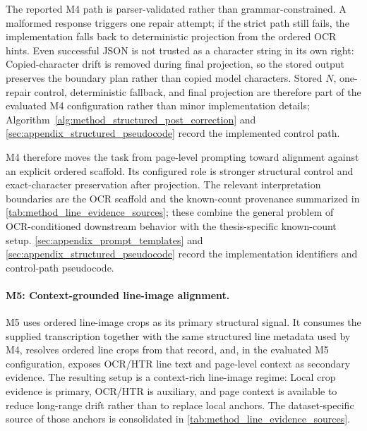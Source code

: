 The reported M4 path is parser-validated rather than grammar-constrained. A malformed response triggers one repair attempt; if the strict path still fails, the implementation falls back to deterministic projection from the ordered OCR hints. Even successful JSON is not trusted as a character string in its own right: Copied-character drift is removed during final projection, so the stored output preserves the boundary plan rather than copied model characters. Stored \(N\), one-repair control, deterministic fallback, and final projection are therefore part of the evaluated M4 configuration rather than minor implementation details; Algorithm~\ref{alg:method_structured_post_correction} and \autoref{sec:appendix_structured_pseudocode} record the implemented control path.

M4 therefore moves the task from page-level prompting toward alignment against an explicit ordered scaffold. Its configured role is stronger structural control and exact-character preservation after projection. The relevant interpretation boundaries are the OCR scaffold and the known-count provenance summarized in \autoref{tab:method_line_evidence_sources}; these combine the general problem of OCR-conditioned downstream behavior  with the thesis-specific known-count setup. \autoref{sec:appendix_prompt_templates} and \autoref{sec:appendix_structured_pseudocode} record the implementation identifiers and control-path pseudocode.

\paragraph{M5: Context-grounded line-image alignment.}
\label{sec:method_m5}
M5 uses ordered line-image crops as its primary structural signal. It consumes the supplied transcription together with the same structured line metadata used by M4, resolves ordered line crops from that record, and, in the evaluated M5 configuration, exposes OCR/HTR line text and page-level context as secondary evidence. The resulting setup is a context-rich line-image regime: Local crop evidence is primary, OCR/HTR is auxiliary, and page context is available to reduce long-range drift rather than to replace local anchors. The dataset-specific source of those anchors is consolidated in \autoref{tab:method_line_evidence_sources}.

